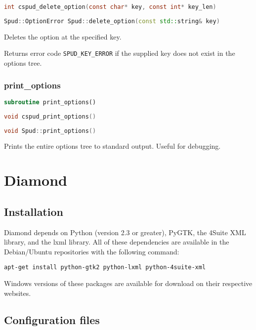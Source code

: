\documentclass[a4paper, 11pt]{book}
\begin{document}
\begin{lstlisting}[language=C]
int cspud_delete_option(const char* key, const int* key_len)
\end{lstlisting}

\begin{lstlisting}[language=C++]
Spud::OptionError Spud::delete_option(const std::string& key)
\end{lstlisting}

Deletes the option at the specified key.

Returns error code \lstinline+SPUD_KEY_ERROR+ if the supplied key does not
exist in the options tree.

\subsection{print\_options}

\begin{lstlisting}[language=fortran]
subroutine print_options()
\end{lstlisting}

\begin{lstlisting}[language=C]
void cspud_print_options()
\end{lstlisting}

\begin{lstlisting}[language=C++]
void Spud::print_options()
\end{lstlisting}

Prints the entire options tree to standard output. Useful for debugging.

\chapter{Diamond}

\section{Installation}
Diamond depends on Python (version 2.3 or greater), PyGTK,
the 4Suite XML library, and the lxml library. All of these dependencies
are available in the Debian/Ubuntu repositories with the following command:
\begin{verbatim}
apt-get install python-gtk2 python-lxml python-4suite-xml
\end{verbatim}

Windows versions of these packages are available for download on their respective websites.

\section{Configuration files}
\end{document}
